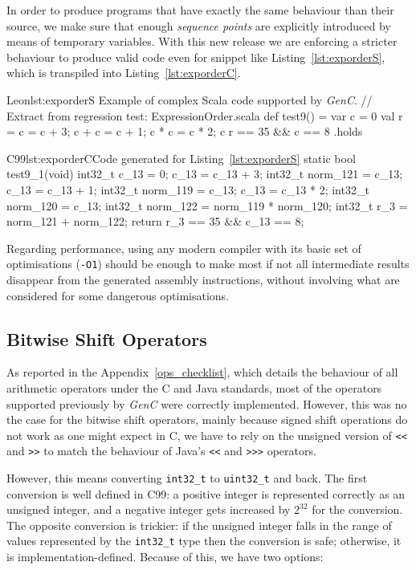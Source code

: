 \documentclass[a4paper,twoside]{article}
\newcommand{\Inline}[1]{\lstinline[basicstyle=\ttfamily]|#1|}
\newcommand{\InlineC}[1]{\lstinline[language=C99]|#1|}
\newcommand{\InlineS}[1]{\lstinline[language=Leon]|#1|}
\newcommand{\GenC}{\emph{GenC}\xspace}
\newcommand{\RefApp}[1]{Appendix~\ref{#1}}
\newcommand{\RefCode}[1]{Listing~\ref{#1}}
\begin{document}
In order to produce programs that have exactly the same behaviour than their
source, we make sure that enough \emph{sequence points} are explicitly
introduced by means of temporary variables. With this new release we are
enforcing a stricter behaviour to produce valid code even for snippet like
\RefCode{lst:exporderS}, which is transpiled into \RefCode{lst:exporderC}.

\begin{Code}{Leon}{lst:exporderS}{%
Example of complex Scala code supported by \GenC.}
// Extract from regression test: ExpressionOrder.scala
def test9() = {
  var c = 0
  val r = { c = c + 3; c } + { c = c + 1; c } * { c = c * 2; c }
  r == 35 && c == 8
}.holds
\end{Code}

\begin{Code}{C99}{lst:exporderC}{Code generated for \RefCode{lst:exporderS}}
static bool test9_1(void) {
    int32_t c_13 = 0;
    c_13 = c_13 + 3;
    int32_t norm_121 = c_13;
    c_13 = c_13 + 1;
    int32_t norm_119 = c_13;
    c_13 = c_13 * 2;
    int32_t norm_120 = c_13;
    int32_t norm_122 = norm_119 * norm_120;
    int32_t r_3 = norm_121 + norm_122;
    return r_3 == 35 && c_13 == 8;
}
\end{Code}

Regarding performance, using any modern compiler with its basic set of
optimisations (\Inline{-O1}) should be enough to make most if not all
intermediate results disappear from the generated assembly instructions, without
involving what are considered for some dangerous optimisations.

\subsection{Bitwise Shift Operators}
\label{shifts}

As reported in the \RefApp{ops_checklist}, which details the behaviour of all
arithmetic operators under the C and Java standards, most of the operators
supported previously by \GenC were correctly implemented.  However, this was no
the case for the bitwise shift operators, mainly because signed shift operations
do not work as one might expect in C, we have to rely on the unsigned version of
\InlineC{<<} and \InlineC{>>} to match the behaviour of Java's \InlineS{<<} and
\InlineS{>>>} operators.

However, this means converting \InlineC{int32_t} to \InlineC{uint32_t} and back.
The first conversion is well defined in C99: a positive integer is represented
correctly as an unsigned integer, and a negative integer gets increased by
$2^{32}$ for the conversion. The opposite conversion is trickier: if the
unsigned integer falls in the range of values represented by the
\InlineC{int32_t} type then the conversion is safe; otherwise, it is
implementation-defined. Because of this, we have two options:
\end{document}

